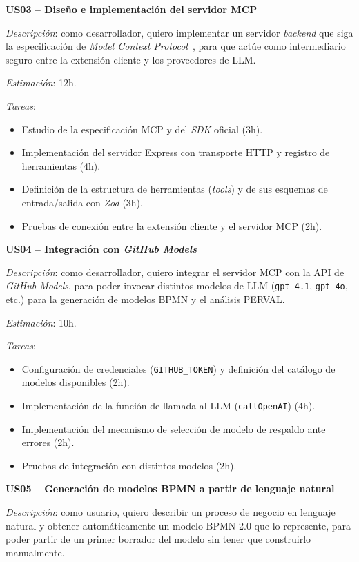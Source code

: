 {\textbf{US03 -- Diseño e implementación del servidor MCP}

\textit{Descripción}: como desarrollador, quiero implementar un servidor \textit{backend} que siga la especificación de \textit{Model Context Protocol}~\cite{anthropic2024mcp}, para que actúe como intermediario seguro entre la extensión cliente y los proveedores de LLM.

\textit{Estimación}: 12h.

\textit{Tareas}:
\begin{itemize}
    \item Estudio de la especificación MCP y del \textit{SDK} oficial (3h).
    \item Implementación del servidor Express con transporte HTTP y registro de herramientas (4h).
    \item Definición de la estructura de herramientas (\textit{tools}) y de sus esquemas de entrada/salida con \textit{Zod} (3h).
    \item Pruebas de conexión entre la extensión cliente y el servidor MCP (2h).
\end{itemize}

\textbf{US04 -- Integración con \textit{GitHub Models}}

\textit{Descripción}: como desarrollador, quiero integrar el servidor MCP con la API de \textit{GitHub Models}, para poder invocar distintos modelos de LLM (\texttt{gpt-4.1}, \texttt{gpt-4o}, etc.) para la generación de modelos BPMN y el análisis PERVAL.

\textit{Estimación}: 10h.

\textit{Tareas}:
\begin{itemize}
    \item Configuración de credenciales (\texttt{GITHUB\_TOKEN}) y definición del catálogo de modelos disponibles (2h).
    \item Implementación de la función de llamada al LLM (\texttt{callOpenAI}) (4h).
    \item Implementación del mecanismo de selección de modelo de respaldo ante errores (2h).
    \item Pruebas de integración con distintos modelos (2h).
\end{itemize}

\textbf{US05 -- Generación de modelos BPMN a partir de lenguaje natural}

\textit{Descripción}: como usuario, quiero describir un proceso de negocio en lenguaje natural y obtener automáticamente un modelo BPMN 2.0 que lo represente, para poder partir de un primer borrador del modelo sin tener que construirlo manualmente.

}
